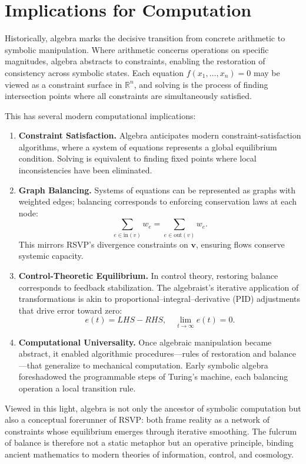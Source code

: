 \documentclass[a4paper,11pt,openany]{book}
\begin{document}
\section{Implications for Computation}

Historically, algebra marks the decisive transition from concrete arithmetic to symbolic manipulation. 
Where arithmetic concerns operations on specific magnitudes, algebra abstracts to constraints, enabling the restoration of consistency across symbolic states. 
Each equation $f(x_1,\dots,x_n)=0$ may be viewed as a constraint surface in $\mathbb{R}^n$, and solving is the process of finding intersection points where all constraints are simultaneously satisfied.

This has several modern computational implications:

\begin{enumerate}
  \item \textbf{Constraint Satisfaction.}  
  Algebra anticipates modern constraint-satisfaction algorithms, where a system of equations represents a global equilibrium condition. 
  Solving is equivalent to finding fixed points where local inconsistencies have been eliminated.

  \item \textbf{Graph Balancing.}  
  Systems of equations can be represented as graphs with weighted edges; balancing corresponds to enforcing conservation laws at each node:
  \[
  \sum_{e \in \text{in}(v)} w_e = \sum_{e \in \text{out}(v)} w_e.
  \]
  This mirrors RSVP’s divergence constraints on $\mathbf{v}$, ensuring flows conserve systemic capacity.

  \item \textbf{Control-Theoretic Equilibrium.}  
  In control theory, restoring balance corresponds to feedback stabilization. 
  The algebraist’s iterative application of transformations is akin to proportional–integral–derivative (PID) adjustments that drive error toward zero:
  \[
  e(t) = LHS - RHS, \quad \lim_{t \to \infty} e(t) = 0.
  \]

  \item \textbf{Computational Universality.}  
  Once algebraic manipulation became abstract, it enabled algorithmic procedures—rules of restoration and balance—that generalize to mechanical computation. 
  Early symbolic algebra foreshadowed the programmable steps of Turing’s machine, each balancing operation a local transition rule.
\end{enumerate}

Viewed in this light, algebra is not only the ancestor of symbolic computation but also a conceptual forerunner of RSVP: both frame reality as a network of constraints whose equilibrium emerges through iterative smoothing. 
The fulcrum of balance is therefore not a static metaphor but an operative principle, binding ancient mathematics to modern theories of information, control, and cosmology.
\end{document}
